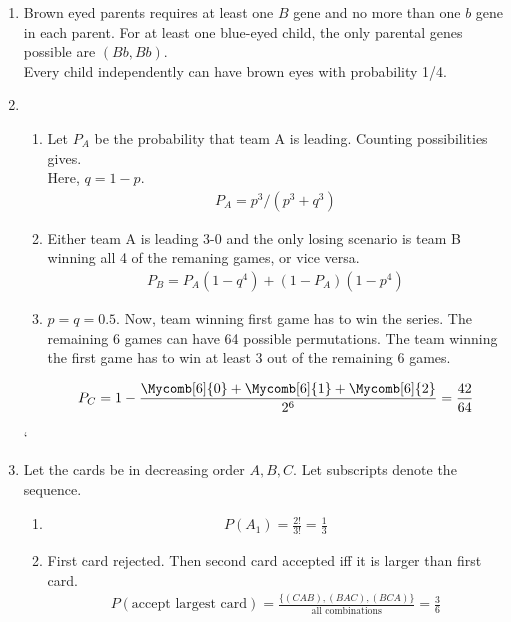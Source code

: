 \begin{enumerate}
	\item Brown eyed parents requires at least one $ B $ gene and no more than one $ b $ gene in each parent. For at least one blue-eyed child, the only parental genes possible are $ (Bb, Bb) $.\\
	Every child independently can have brown eyes with probability 1/4.\\
	
	\item \begin{enumerate}
		\item Let $ P_A $ be the probability that team A is leading. Counting possibilities gives. \\
		Here, $ q = 1-p $. 
		\begin{align}
			P_A = p^3 / (p^3 + q^3)
		\end{align}
		
		\item Either team A is leading 3-0 and the only losing scenario is team B winning all 4 of the remaning games, or vice versa. 
		\begin{align}
			P_B = P_A (1 - q^4) + (1 - P_A)(1 - p^4)
		\end{align}
		
		\item $ p = q = 0.5 $. Now, team winning first game has to win the series.
		The remaining 6 games can have 64 possible permutations. The team winning the first game has to win at least 3 out of the remaining 6 games. 
		
		\begin{align}
			P_C = 1 - \frac{\Mycomb[6]{0} + \Mycomb[6]{1} + \Mycomb[6]{2} }{2^6} = \frac{42}{64}
		\end{align}
		
	\end{enumerate}
	
	`	\item Let the cards be in decreasing order $ A, B, C $. Let subscripts denote the sequence.\\
	\begin{enumerate}
		\item \begin{align}
			P(A_1) = \frac{2!}{3!} = \frac{1}{3}
		\end{align}
		
		\item First card rejected. Then second card accepted iff it is larger than first card.\\
		\begin{subequations}
			\begin{align}
				P(\text{accept largest card}) = \frac{\{(CAB), (BAC), (BCA)\}}{\text{all combinations}} = \frac{3}{6}
			\end{align}
		\end{subequations}
	\end{enumerate}
	

\end{enumerate}
